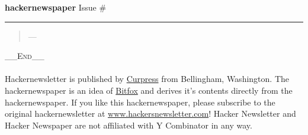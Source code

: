 \documentclass[10pt,a4paper]{article}
\begin{document}
\thispagestyle{empty}
\Huge {} 
\noindent\textbf{hacker{\color{red}news}paper}
\normalfont
\normalsize
\hfill Issue \#

{\noindent\color{red} \rule{\linewidth}{0.5mm}}

\begin{quotation}
    \textit{} \par\hfill ---  
\end{quotation}

\tableofcontents
\vfill
\noindent\color{gray}
\huge \textsc{\_\_End\_\_ } \\ \\ 
\small Hackernewsletter is published by \href{www.curpress.com}{Curpress} from Bellingham, Washington. The hackernewspaper is an idea of \href{www.bitfox.nl}{Bitfox} and derives it's contents directly from the hackernewspaper. If you like this hackernewspaper, please subscribe to the original hackernewsletter at \href{www.hackersnewsletter.com}{www.hackersnewsletter.com}! Hacker Newsletter and Hacker Newspaper are not affiliated with Y Combinator in any way.

\color{black}

\newpage
\pagestyle{fancy}

\section{}



\subsection{}
\noindent\begin{minipage}[t]{0.19\linewidth}
\vspace{0pt}
\noindent\scshape\footnotesize
\\ {\scriptsize\fa{}}\space 
\href{\VAR{p.url}}{} 

\end{minipage} 
\begin{minipage}[t]{0.80\linewidth}
\vspace{0pt}
\begin{multicols}{2}
    \href{\VAR{n.url}}{
        \texttt{[image: \\VAR\{n.image]}}
    }
\paragraph{\VAR{n.firstline}}
\VAR{n.content}
\dots
\end{multicols}
\end{minipage}
\par\medskip
\end{document}
